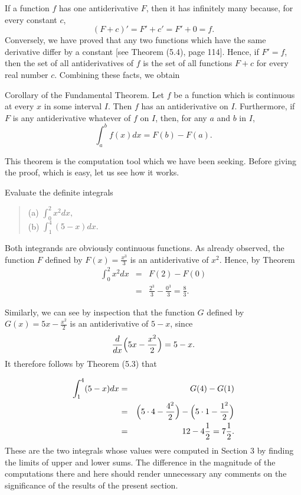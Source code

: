 If a function $f$ has one antiderivative $F$, then it has infinitely many because, for every constant
$c$,
$$
(F + c)' = F' + c' = F' + 0 = f.
$$
\noindent Conversely, we have proved that any two functions which have the same derivative differ by a constant [see Theorem (5.4), page 114]. Hence, if $F' = f$, then the set of all antiderivatives of $f$ is the set of all functions $F + c$ for every real number $c$. Combining these facts, we obtain
 
\begin{prop}{Corollary of the Fundamental Theorem.}
\label{thm 4.5.3}
Let $f$ be a function which is continuous at every $x$ in some interval $I$. Then $f$ has an antiderivative on $I$. Furthermore, if $F$ is any antiderivative whatever of $f$ on $I$, then, for any $a$ and $b$ in $I$,
$$
\int_{a}^{b} f (x) dx = F(b) - F(a).
$$
\end{prop}

This theorem is the computation tool which we have been seeking. Before giving the proof, which is easy, let us see how it works.

\begin{example}
Evaluate the definite integrals
 
\begin{quote}
\begin{description}
\item[(a) $\int_{0}^{2} x^2 dx,$]
\item[(b) $\int_{1}^{4} (5 - x) dx.$]
\end{description}
\end{quote}

\noindent Both integrands are obviously continuous functions. As already observed, the function $F$ defined by $F(x) = \frac{x^3}{3}$ is an antiderivative of $x^2$. Hence, by Theorem  
\begin{eqnarray*}
\int_{0}^{2} x^2 dx &=& F(2) - F(0) \\
                    &=& \frac{2^3}{3} - \frac{0^3}{3} = \frac{8}{3}.
\end{eqnarray*}

\noindent Similarly, we can see by inspection that the function $G$ defined by $G(x) = 5x - \frac{x^2}{ 2}$ is an antiderivative of $5 - x$, since 
$$
\frac{d}{dx} \Bigl( 5x - \frac{x^2}{2} \Bigr) = 5 - x.
$$
\noindent It therefore follows by Theorem (5.3) that  

\begin{eqnarray*}
\int_{1}^{4} (5 - x)dx &=& G(4) - G(1)  \\
&=& \Bigl( 5 \cdot 4 - \frac{4^2}{2} \Bigr) - \Bigl( 5 \cdot 1 - \frac{1^2}{2} \Bigr) \\
&=& 12 - 4\frac{1}{2} = 7\frac{1}{2}.
\end{eqnarray*}
\noindent These are the two integrals whose values were computed in Section 3 by finding the limits of upper and lower sums. The difference in the magnitude of the computations there and here should render unnecessary any comments on the significance of the results of the present section.
\end{example}
\medskip

